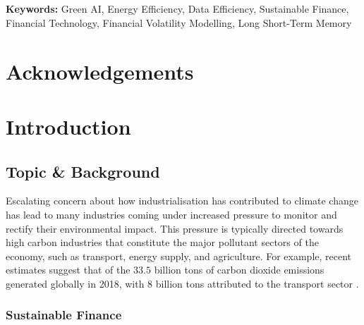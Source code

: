 \documentclass[a4paper, 11pt]{report}
\begin{document}
    \textbf{\\ \\Keywords:} Green AI, Energy Efficiency, Data Efficiency, Sustainable Finance, Financial Technology, Financial Volatility Modelling, Long Short-Term Memory


    \newpage
    \chapter*{Acknowledgements}


    \newpage
    \tableofcontents


    \newpage 
    \listoffigures


    \newpage
    \listoftables 




    \newpage
    \chapter{Introduction}
    \label{chapter: intro}

    \section{Topic \& Background}
    \label{section: topic}

    Escalating concern about how industrialisation has contributed to climate change has lead to many industries coming under increased pressure to monitor and rectify their environmental impact. This pressure is typically directed towards high carbon industries that constitute the major pollutant sectors of the economy, such as transport, energy supply, and agriculture. For example, recent estimates suggest that of the $33.5$ billion tons of carbon dioxide emissions generated globally in 2018, with $8$ billion tons attributed to the transport sector \citep{iea-2022}.


    \subsection{Sustainable Finance}
\end{document}
